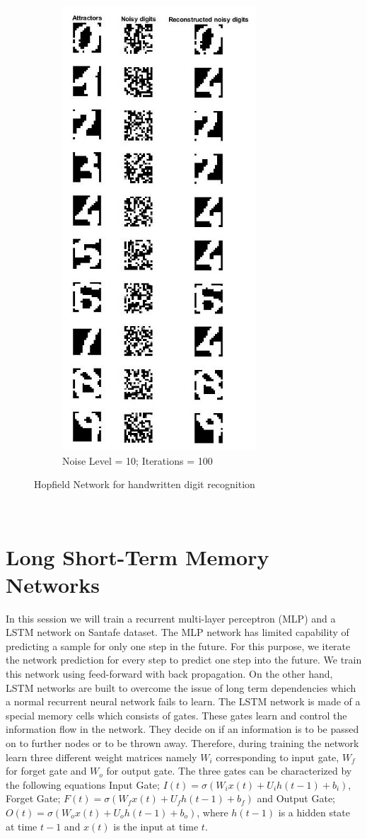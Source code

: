 \begin{figure}[ht]
\begin{subfigure}[b]{0.26\textwidth}
		\includegraphics[height = 1.2\textwidth,width = 0.8\textwidth]{Exercise2/Report/hdr_n10_itr100.jpg}
		\caption{Noise Level = 10; Iterations = 100}\label{fig:hop_digit4)}
	\end{subfigure}%
	\caption{Hopfield Network for handwritten digit recognition}
	\label{fig:hop_digit}
\end{figure}\\
\section{Long Short-Term Memory Networks}
In this session we will train a recurrent multi-layer perceptron (MLP) and a LSTM network on Santafe dataset. The MLP network has limited capability of predicting a sample for only one step in the future. For this purpose, we iterate the network prediction for every step to predict one step into the future. We train this network using feed-forward with back propagation. On the other hand, LSTM networks are built to overcome the issue of long term dependencies which a normal recurrent neural network fails to learn. The LSTM network is made of a special memory cells which consists of gates. These gates learn and control the information flow in the network. They decide on if an information is to be passed on to further nodes or to be thrown away. Therefore, during training the network learn three different weight matrices namely $W_i$ corresponding to input gate, $W_f$ for forget gate and $W_o$ for output gate. The three gates can be characterized by the following equations Input Gate; $I(t) = \sigma (W_i x(t) + U_i h(t−1) + b_i)$, Forget Gate; $F(t) = \sigma (W_f x(t) + U_f h(t−1) + b_f)$ and Output Gate; $O(t) = \sigma (W_o x(t) + U_o h(t−1)+b_o)$, where $h(t-1)$ is a hidden state at time $t-1$ and $x(t)$ is the input at time $t$. 
